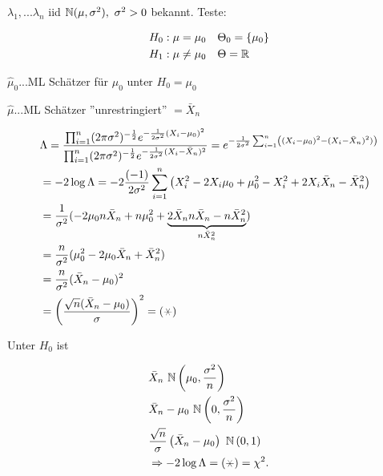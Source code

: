 \documentclass{tstextbook}
\begin{document}
	\begin{example}
	$\lambda_1,...\lambda_n$ iid $\N ( \mu, \sigma^2) ,  \ \sigma^2>0$ bekannt. Teste:
	
	  \[
	\begin{aligned}
	&H_0: \mu=\mu_0 \quad \Theta_0 = \{ \mu_0 \} \\
	&H_1:  \mu \neq \mu_0 \quad \Theta =  \mathbb R 
	\end{aligned}
	\]
	
	$\hat{\mu}_0$...ML Schätzer für $\mu_0$ unter $H_0 = \mu_0$
	
	$\hat{\mu}$...ML Schätzer ''unrestringiert''   $= \bar{X}_n$ 
	
	  \[
	\begin{aligned}
	 &\Lambda = \frac{ \prod_{i=1}^{n} (2\pi\sigma^2)^{-\frac{1}{2}} e^{-\frac{1}{2\sigma^2} (X_i-\mu_0)^2} }{ \prod_{i=1}^{n} (2\pi\sigma^2)^{-\frac{1}{2}} e^{-\frac{1}{2\sigma^2} (X_i-\bar{X}_n)^2}   } = e^{ -\frac{1}{2\sigma^2} \sum_{i=1}^{n} \left( (X_i-\mu_0)^2 - (X_i - \bar{X}_n)^2) \right) } \\
	 &= -2 \log \Lambda = -2\frac{(-1)}{2\sigma^2}\sum_{i=1}^{n} \left( X_i^2 -2 X_i \mu_0 +\mu_0^2  - X_i^2 +2X_i \bar{X}_n - \bar{X}_n^2 \right) \\
	 &= \frac{1}{\sigma^2} (-2\mu_0 n \bar{X}_n + n\mu_0^2 + \underbrace{2 \bar{X}_n n  \bar{X}_n -  n\bar{X}_n^2}_{n \bar{X}_n^2}) \\
	 & =  \frac{n}{\sigma^2} (\mu_0^2 -2\mu_0 \bar{X}_n + \bar{X}_n^2 ) \\
	&=  \frac{n}{\sigma^2} (\bar{X}_n - \mu_0)^2  \\
	&=  \left( \frac{\sqrt{n}(\bar{X}_n - \mu_0)}{\sigma} \right) ^2  = ( \hexstar) 
	\end{aligned}
	\]
	
	Unter $H_0$ ist
	
	  \[
	\begin{aligned}
	&\bar{X}_n ~ \N \left( \mu_0, \frac{\sigma^2}{n} \right) \\
	&\bar{X}_n - \mu_0 ~ \N \left( 0, \frac{\sigma^2}{n} \right) \\
	&  \frac{\sqrt{n}}{\sigma} \left( \bar{X}_n - \mu_0 \right)~ \N \left( 0, 1 \right) \\
	& \Rightarrow -2\log \Lambda = (\hexstar) = \chi^2.
	\end{aligned}
	\] 
	
	
	\end{example}


	
\end{document}
